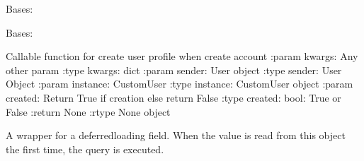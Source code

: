 \documentclass[letterpaper,10pt,english]{sphinxmanual}
\begin{document}
\begin{fulllineitems}
\begin{savenotes}
\begin{longtable}[c]{}
\endlastfoot

\end{longtable}\sphinxatlongtableend\end{savenotes}

\begin{fulllineitems}
\label{\detokenize{vtcvlp:vtcuser.models.CustomUser.DoesNotExist}}
Bases: 

\end{fulllineitems}


\begin{fulllineitems}
\label{\detokenize{vtcvlp:vtcuser.models.CustomUser.MultipleObjectsReturned}}
Bases: 

\end{fulllineitems}


\begin{fulllineitems}
\label{\detokenize{vtcvlp:vtcuser.models.CustomUser.create_user_profile}}
Callable function for create user profile when create account
:param kwargs: Any other param
:type kwargs: dict
:param sender: User object
:type sender: User Object
:param instance: CustomUser
:type instance: CustomUser object
:param created: Return True if creation else return False
:type created: bool: True or False
:return None
:rtype None object

\end{fulllineitems}


\begin{fulllineitems}
\label{\detokenize{vtcvlp:vtcuser.models.CustomUser.id}}
A wrapper for a deferred\sphinxhyphen{}loading field. When the value is read from this
object the first time, the query is executed.


\end{fulllineitems}
\end{fulllineitems}
\end{document}
